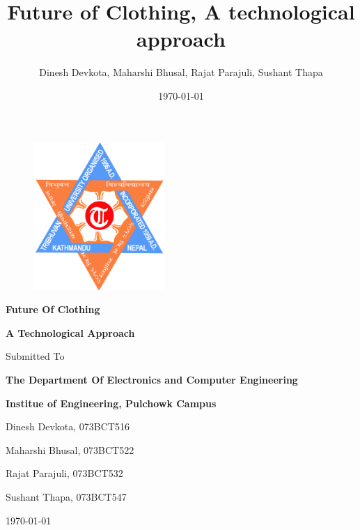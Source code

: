 \documentclass{article}
\title{Future of Clothing, A technological approach}
\author{Dinesh Devkota,
Maharshi Bhusal, Rajat Parajuli, Sushant Thapa}
\date{\today}
\begin{document}
\begin{figure}[H]
    \centering
    \includegraphics[width=5cm]{images/tuLogo.png}
\end{figure}

\begin{center}
\textbf {{\Huge Future Of Clothing}}
\end{center}

\begin{center}
\textbf {{\huge A Technological Approach}}
\end{center}

\begin{center}

Submitted To
\end{center}

\begin{center}
\textbf {{\huge The Department Of Electronics and Computer Engineering}}
\end{center}

\begin{center}
\textbf {{ Institue of Engineering, Pulchowk Campus}}
\end{center}

\begin{center}

Dinesh Devkota, 073BCT516
\end{center}

\begin{center}
Maharshi Bhusal, 073BCT522
\end{center}

\begin{center}
Rajat Parajuli, 073BCT532
\end{center}

\begin{center}
Sushant Thapa, 073BCT547
\end{center}

\begin{center}

\today
\end{center}
\newpage
\end{document}
